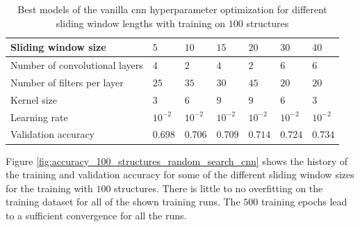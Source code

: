 \documentclass[conference]{IEEEtran}
\begin{document}
\begin{table}[htp]
	\centering
	\caption{Best models of the vanilla \gls{cnn} hyperparameter optimization for different sliding window lengths with training on $ 100 $ structures}
	\label{tab:hyperparameters_100_structures}
	\setlength{\tabcolsep}{3pt} %
	\begin{tabular}{p{2.5cm}|llllll}
		Sliding window size & $ 5 $ & $ 10 $ & $ 15 $ & $ 20 $ & $ 30 $ & $ 40 $ \\
		\hline
		Number of convolutional layers & $ 4 $ & $ 2 $ & $ 4 $ & $ 2 $ & $ 6 $ & $ 6 $ \\
		Number of filters per layer & $ 25 $ & $ 35 $ & $ 30 $ & $ 45 $ & $ 20 $ & $ 20 $ \\
		Kernel size & $ 3 $ & $ 6 $ & $ 9 $ & $ 9 $ & $ 6 $ & $ 3 $ \\
		Learning rate & $ 10^{-2} $ & $ 10^{-2} $ & $ 10^{-2} $ & $ 10^{-2} $ & $ 10^{-2} $ & $ 10^{-2} $ \\
		\hline
		Validation accuracy & $ 0.698 $ & $ 0.706 $ & $ 0.709 $ & $ 0.714 $ & $ 0.724 $ & $ 0.734 $
	\end{tabular}
\end{table}

Figure \ref{fig:accuracy_100_structures_random_search_cnn} shows the history of the training and validation accuracy for some of the different sliding window sizes for the training with $ 100 $ structures. There is little to no overfitting on the training dataset for all of the shown training runs. The $ 500 $ training epochs lead to a sufficient convergence for all the runs.
\end{document}
